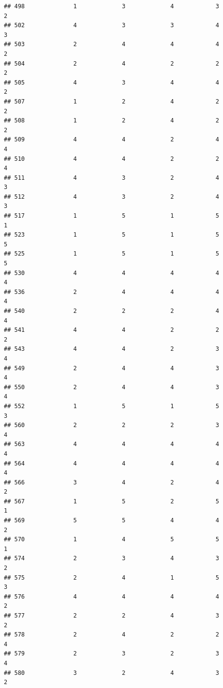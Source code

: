 \documentclass[
]{article}
\begin{document}
\begin{verbatim}
## 498              1             3             4            3          2
## 502              4             3             3            4          3
## 503              2             4             4            4          2
## 504              2             4             2            2          2
## 505              4             3             4            4          2
## 507              1             2             4            2          2
## 508              1             2             4            2          2
## 509              4             4             2            4          4
## 510              4             4             2            2          4
## 511              4             3             2            4          3
## 512              4             3             2            4          3
## 517              1             5             1            5          1
## 523              1             5             1            5          5
## 525              1             5             1            5          5
## 530              4             4             4            4          4
## 536              2             4             4            4          4
## 540              2             2             2            4          4
## 541              4             4             2            2          2
## 543              4             4             2            3          4
## 549              2             4             4            3          4
## 550              2             4             4            3          4
## 552              1             5             1            5          3
## 560              2             2             2            3          4
## 563              4             4             4            4          4
## 564              4             4             4            4          4
## 566              3             4             2            4          2
## 567              1             5             2            5          1
## 569              5             5             4            4          2
## 570              1             4             5            5          1
## 574              2             3             4            3          2
## 575              2             4             1            5          3
## 576              4             4             4            4          2
## 577              2             2             4            3          2
## 578              2             4             2            2          4
## 579              2             3             2            3          4
## 580              3             2             4            3          2

\end{verbatim}
\end{document}
